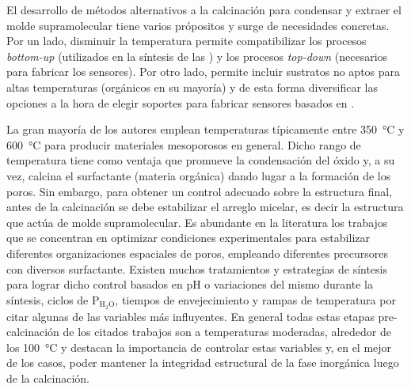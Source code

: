 	El desarrollo de métodos alternativos a la calcinación para condensar y extraer el molde supramolecular tiene varios própositos y surge de necesidades concretas. Por un lado, disminuir la temperatura permite compatibilizar los procesos \textit{bottom-up} (utilizados en la síntesis de las \pdm) y los procesos \textit{top-down} (necesarios para fabricar los sensores). Por otro lado, permite incluir sustratos no aptos para altas temperaturas (orgánicos en su mayoría) y de esta forma diversificar las opciones a la hora de elegir soportes para fabricar sensores basados en \pdm.\cite{Doshi2000a,Wagner2013,Innocenzi2013,Soler-Illia2002a,Zhang2005}

	La gran mayoría de los autores emplean temperaturas típicamente entre \SI{350}{\celsius} y \SI{600}{\celsius} para producir materiales mesoporosos en general.\cite{Kresge1992,Beck1992,DiRenzo1997}  Dicho rango de temperatura tiene como ventaja que promueve la condensación del óxido y, a su vez, calcina el surfactante (materia orgánica) dando lugar a la formación de los poros. Sin embargo, para obtener un control adecuado sobre la estructura final, antes de la calcinación se debe estabilizar el arreglo micelar, es decir la estructura que actúa de molde supramolecular. Es abundante en la literatura los trabajos que se concentran en optimizar condiciones experimentales para estabilizar diferentes organizaciones espaciales de poros, empleando diferentes precursores con diversos surfactante\cite{Huo1996,Herregods2013,Grosso2001}. Existen muchos tratamientos y estrategias de síntesis para lograr dicho control basados en pH o variaciones del mismo durante la síntesis\cite{Doshi2000a,Soler-Illia2011,Boissiere2000,Huo1996,GonzalezSolveyra2017,Ichinose2002}, ciclos de P$_\text{H$_2$O}$\cite{Cagnol2002,Soler-Illia2012}, tiempos de envejecimiento\cite{Malfatti2009,Grosso2001} y rampas de temperatura\cite{Huang2002,Andrini2016,Soler-Illia2006,Rohlfing2005} por citar algunas de las variables más influyentes. En general todas estas etapas pre-calcinación de los citados trabajos son a temperaturas moderadas, alrededor de los \SI{100}{\celsius} y destacan la importancia de controlar estas variables y, en el mejor de los casos, poder mantener la integridad estructural de la fase inorgánica luego de la calcinación. 

